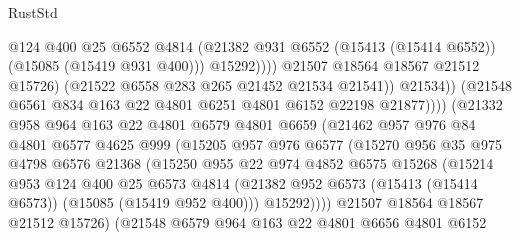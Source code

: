 \begin{lexlean}{RustStd}
\begin{coremodule}
                                      @124
                                      @400
                                      @25
                                      @6552
                                      @4814
                                      (@21382
                                        @931
                                        @6552
                                        (@15413 (@15414 @6552))
                                        (@15085 (@15419 @931 @400)))
                                      @15292))))
                              @21507
                              @18564
                              @18567
                              @21512
                              @15726)
                            (@21522 @6558 @283 @265 @21452 @21534 @21541))
                          @21534))
                      (@21548 @6561 @834 @163 @22 @4801 @6251 @4801 @6152 @22198 @21877))))
                (@21332
                  @958
                  @964
                  @163
                  @22
                  @4801
                  @6579
                  @4801
                  @6659
                  (@21462
                    @957
                    @976
                    @84
                    @4801
                    @6577
                    @4625
                    @999
                    (@15205
                      @957
                      @976
                      @6577
                      (@15270
                        @956
                        @35
                        @975
                        @4798
                        @6576
                        @21368
                        (@15250
                          @955
                          @22
                          @974
                          @4852
                          @6575
                          @15268
                          (@15214
                            @953
                            @124
                            @400
                            @25
                            @6573
                            @4814
                            (@21382 @952 @6573 (@15413 (@15414 @6573)) (@15085 (@15419 @952 @400)))
                            @15292))))
                    @21507
                    @18564
                    @18567
                    @21512
                    @15726)
                  (@21548
                    @6579
                    @964
                    @163
                    @22
                    @4801
                    @6656
                    @4801
                    @6152

\end{coremodule}
\end{lexlean}
